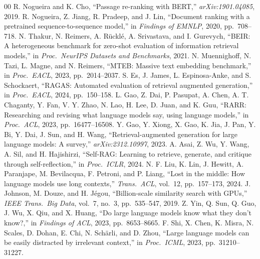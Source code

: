 \documentclass[conference]{IEEEtran}
\begin{document}
\begin{thebibliography}{00}
 R. Nogueira and K. Cho, ``Passage re-ranking with BERT,'' \textit{arXiv:1901.04085}, 2019.
 R. Nogueira, Z. Jiang, R. Pradeep, and J. Lin, ``Document ranking with a pretrained sequence-to-sequence model,'' in \textit{Findings of EMNLP}, 2020, pp.\ 708--718.
 N. Thakur, N. Reimers, A. R\"uckl\'e, A. Srivastava, and I. Gurevych, ``BEIR: A heterogeneous benchmark for zero-shot evaluation of information retrieval models,'' in \textit{Proc.\ NeurIPS Datasets and Benchmarks}, 2021.
 N. Muennighoff, N. Tazi, L. Magne, and N. Reimers, ``MTEB: Massive text embedding benchmark,'' in \textit{Proc.\ EACL}, 2023, pp.\ 2014--2037.
 S. Es, J. James, L. Espinosa-Anke, and S. Schockaert, ``RAGAS: Automated evaluation of retrieval augmented generation,'' in \textit{Proc.\ EACL}, 2024, pp.\ 150--158.
 L. Gao, Z. Dai, P. Pasupat, A. Chen, A. T. Chaganty, Y. Fan, V. Y. Zhao, N. Lao, H. Lee, D. Juan, and K. Guu, ``RARR: Researching and revising what language models say, using language models,'' in \textit{Proc.\ ACL}, 2023, pp.\ 16477--16508.
 Y. Gao, Y. Xiong, X. Gao, K. Jia, J. Pan, Y. Bi, Y. Dai, J. Sun, and H. Wang, ``Retrieval-augmented generation for large language models: A survey,'' \textit{arXiv:2312.10997}, 2023.
 A. Asai, Z. Wu, Y. Wang, A. Sil, and H. Hajishirzi, ``Self-RAG: Learning to retrieve, generate, and critique through self-reflection,'' in \textit{Proc.\ ICLR}, 2024.
 N. F. Liu, K. Lin, J. Hewitt, A. Paranjape, M. Bevilacqua, F. Petroni, and P. Liang, ``Lost in the middle: How language models use long contexts,'' \textit{Trans.\ ACL}, vol.\ 12, pp.\ 157--173, 2024.
 J. Johnson, M. Douze, and H. J\'egou, ``Billion-scale similarity search with GPUs,'' \textit{IEEE Trans.\ Big Data}, vol.\ 7, no.\ 3, pp.\ 535--547, 2019.
 Z. Yin, Q. Sun, Q. Guo, J. Wu, X. Qiu, and X. Huang, ``Do large language models know what they don't know?,'' in \textit{Findings of ACL}, 2023, pp.\ 8653--8665.
 F. Shi, X. Chen, K. Misra, N. Scales, D. Dohan, E. Chi, N. Sch\"arli, and D. Zhou, ``Large language models can be easily distracted by irrelevant context,'' in \textit{Proc.\ ICML}, 2023, pp.\ 31210--31227.
\end{thebibliography}
\end{document}
